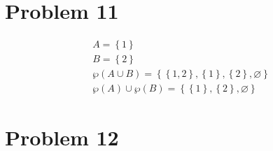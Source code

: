 \documentclass{article}
\begin{document}
\section{Problem 11}
\begin{align*}
 A = \left\{1 \right\} \\
 B = \left\{2 \right\} \\
 \wp(A \cup B) = \left\{\left\{1,2 \right\},\left\{1 \right\}, \left\{2 \right\}, \varnothing  \right\} \\
 \wp(A) \cup \wp(B) = \left\{ \left\{1 \right\},\left\{2 \right\}, \varnothing  \right\} 
\end{align*}

\section{Problem 12}
\begin{align*}
\end{align*}
\end{document}
